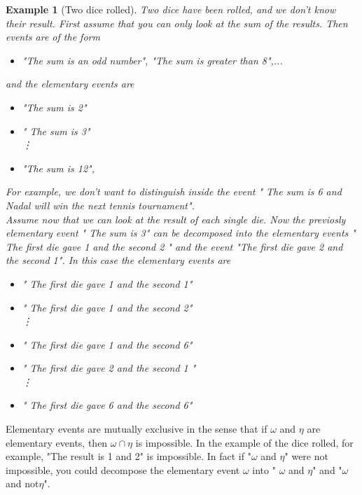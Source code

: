 \documentclass[12pt]{article}
\newtheorem{example}[theorem]{Example}
\newcommand{\<}{{\langle \!\! \langle}}
\renewcommand{\>}{{\rangle \!\! \rangle}}
\newcommand{\commento}[1]{
	\par\noindent
	\colorbox{light}{\begin{minipage}{120 mm}#1\end{minipage}}
	\par\noindent
}
\begin{document}
\begin{example}[Two dice rolled]
Two dice have been rolled, and we don't know their result. First assume that you can only look at the sum of the results. Then events are of the form 
\begin{itemize}

	\item "The sum is an odd number", "The sum is greater than 8",...

\end{itemize}
and the elementary events are 

\begin{itemize}

	\item "The sum is 2" 
	\item " The sum is 3"\\
		\vdots
	\item "The sum is 12",

\end{itemize}
 For example, we don't want to distinguish inside the event " The sum is 6 and Nadal will win the next tennis tournament". \\
 
Assume now that we can look at the result of each single die. Now the previosly elementary event " The sum is 3" can be decomposed into the elementary events " The first die gave 1 and the second 2 " and the event "The first die gave 2 and the second 1". 
In this case the elementary events are
\begin{itemize}

	\item " The first die gave 1 and the second 1"
	\item " The first die gave 1 and the second 2"\\
	\vdots
	\item  " The first die gave 1 and the second 6" 
	\item " The first die gave 2 and the second 1 "\\
	\vdots
	\item " The first die gave 6 and the second 6"   
\end{itemize}

\end{example} 
\commento{Elementary events are mutually exclusive in the sense that if $\omega$ and $\eta$ are elementary events, then $\omega \cap \eta $ is impossible. In the example of the dice rolled, for example, "The result is 1 and 2" is impossible. In fact if "$\omega$ and $\eta$" were not impossible, you could decompose the elementary event $\omega$ into " $\omega$ and $\eta$" and "$\omega$ and not$\eta$". }
\end{document}
